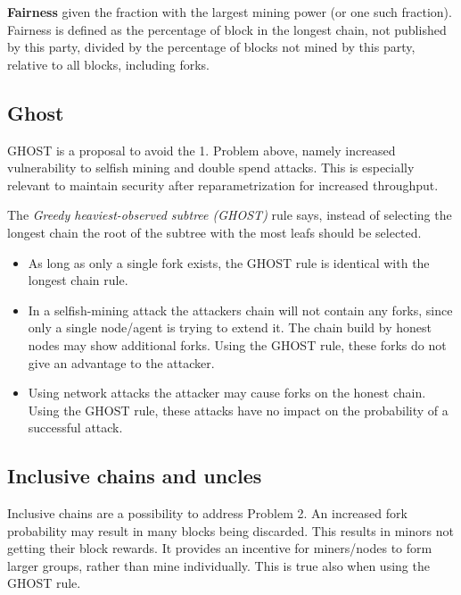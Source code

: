 \begin{definition}
	\textbf{Fairness} given the fraction with the largest mining power (or one such fraction). Fairness is defined as the percentage of block in the longest chain, not published by this party, divided by the percentage of blocks not mined by this party, relative to all blocks, including forks.
\end{definition}

\subsection{Ghost}
GHOST is a proposal to avoid the 1. Problem above, namely increased vulnerability to selfish mining and double spend attacks. This is especially relevant to maintain security after reparametrization for increased throughput.

\begin{definition} The \emph{Greedy heaviest-observed subtree (GHOST)} rule says, instead of selecting the longest chain the root of the subtree with the most leafs should be selected.	
\end{definition}

\begin{note}
	\begin{itemize}
		\item As long as only a single fork exists, the GHOST rule is identical with the longest chain rule.
		\item In a selfish-mining attack the attackers chain will not contain any forks, since only a single node/agent is trying to extend it. The chain build by honest nodes may show additional forks. Using the GHOST rule, these forks do not give an advantage to the attacker.
		\item Using network attacks the attacker may cause forks on the honest chain. Using the GHOST rule, these attacks have no impact on the probability of a successful attack.
	\end{itemize}
\end{note}

\subsection{Inclusive chains and uncles}
Inclusive chains are a possibility to address Problem 2.
An increased fork probability may result in many blocks being discarded. This results in minors not getting their block rewards. It provides an incentive for miners/nodes to form larger groups, rather than mine individually. 
This is true also when using the GHOST rule.

